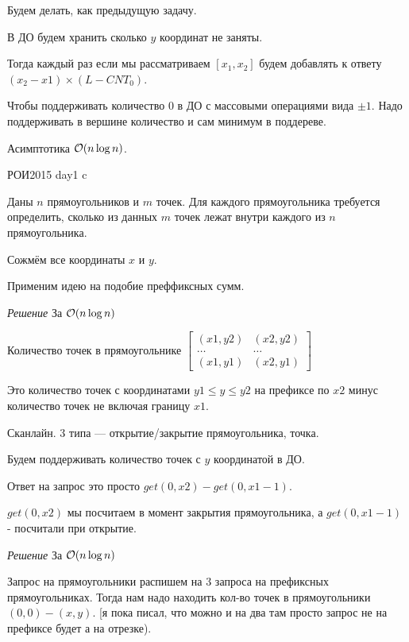 Будем делать, как предыдущую задачу.

В ДО будем хранить сколько $y$ координат не заняты.

Тогда каждый раз если мы рассматриваем $[x_1, x_2]$ будем добавлять к ответу $(x_2 - x1) \times (L - CNT_0)$.

Чтобы поддерживать количество $0$ в ДО с массовыми операциями вида $\pm 1$. Надо поддерживать в вершине количество и сам минимум в поддереве. 

Асимптотика $\mathcal{O}(n \log n)$.


РОИ2015 day1 c

Даны $n$ прямоугольников и $m$ точек. Для каждого прямоугольника требуется определить, сколько из данных $m$ точек лежат внутри каждого из $n$ прямоугольника.

Сожмём все координаты $x$ и $y$.

Применим идею на подобие преффиксных сумм.

\down
\down

{\it Решение } За $\mathcal{O}(n \log n)$

Количество точек в прямоугольнике $\begin{bmatrix}

(x1, y2) & (x2, y2)\\

\ldots   & \ldots\\

(x1, y1) & (x2, y1)

\end{bmatrix}$ 

Это количество точек с координатами $y1 \le y \le y2$ на префиксе по $x2$ минус количество точек не включая границу $x1$.

Сканлайн. 3 типа --- открытие/закрытие прямоугольника, точка.

Будем поддерживать количество точек с $y$ координатой в ДО.

Ответ на запрос это просто $get(0, x2) - get(0, x1 - 1)$.

$get(0, x2)$ мы посчитаем в момент закрытия прямоугольника, а $get(0, x1 - 1)$  - посчитали при открытие.

\down

{\it Решение } За $\mathcal{O}(n \log n)$

Запрос на прямоугольники распишем на $3$ запроса на префиксных прямоугольниках. Тогда нам надо находить кол-во точек в прямоугольники $(0, 0)-(x, y)$. [я пока писал, что можно и на два там просто запрос не на префиксе будет а на отрезке).

